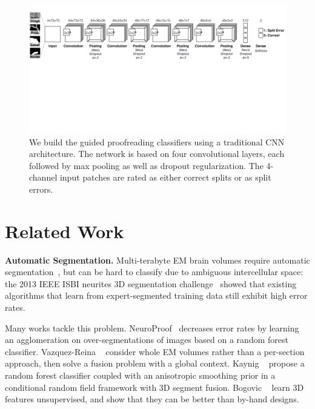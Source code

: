 \begin{figure}[t]
\begin{center}
\includegraphics[width=\linewidth]{gfx/architecture.pdf}
\end{center}
  \vspace{-4mm}
   \caption{We build the guided proofreading classifiers using a traditional CNN architecture. The network is based on four convolutional layers, each followed by max pooling as well as dropout regularization. The 4-channel input patches are rated as either correct splits or as split errors.}
\label{fig:architecture}
\end{figure}

\section{Related Work}

\textbf{Automatic Segmentation.} Multi-terabyte EM brain volumes require automatic segmentation~\cite{jain2010,Liu2014,NunezIglesias2013Machine,GALA2014}, but can be hard to classify due to ambiguous intercellular space: the 2013 IEEE ISBI neurites 3D segmentation challenge~\cite{isbi_challenge} showed that existing algorithms that learn from expert-segmented training data still exhibit high error rates.

Many works tackle this problem. NeuroProof~\cite{neuroproof2013} decreases error rates by learning an agglomeration on over-segmentations of images based on a random forest classifier. Vazquez-Reina \etal~\cite{amelio_segmentation} consider whole EM volumes rather than a per-section approach, then solve a fusion problem with a global context. Kaynig \etal~\cite{kaynig10} propose a random forest classifier coupled with an anisotropic smoothing prior in a conditional random field framework with 3D segment fusion. Bogovic \etal~\cite{BogovicHJ13} learn 3D features unsupervised, and show that they can be better than by-hand designs.

